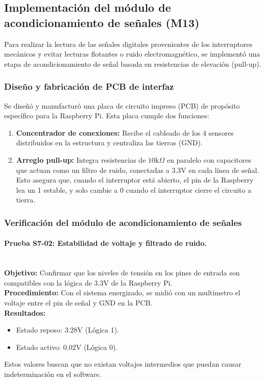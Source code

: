\subsection{Implementación del módulo de acondicionamiento de señales (M13)}

Para realizar la lectura de las señales digitales provenientes de los interruptores mecánicos y evitar lecturas flotantes o ruido electromagnético, se implementó una etapa de acondicionamiento de señal basada en resistencias de elevación (pull-up).

\subsubsection{Diseño y fabricación de PCB de interfaz}
Se diseñó y manufacturó una placa de circuito impreso (PCB) de propósito específico para la Raspberry Pi. Esta placa cumple dos funciones:
\begin{enumerate}
	\item \textbf{Concentrador de conexiones:} Recibe el cableado de los 4 sensores distribuidos en la estructura y centraliza las tierras (GND).
	\item \textbf{Arreglo pull-up:} Integra resistencias de $10\text{k}\Omega$ en paralelo con capacitores que actuan como un filtro de ruido, conectadas a 3.3V en cada línea de señal. Esto asegura que, cuando el interruptor está abierto, el pin de la Raspberry lea un 1 estable, y solo cambie a 0 cuando el interruptor cierre el circuito a tierra.
\end{enumerate}

\subsubsection{Verificación del módulo de acondicionamiento de señales}
\paragraph*{Prueba S7-02: Estabilidad de voltaje y filtrado de ruido.}\mbox{}\\
\textbf{Objetivo:} Confirmar que los niveles de tensión en los pines de entrada son compatibles con la lógica de 3.3V de la Raspberry Pi.
\\
\textbf{Procedimiento:} Con el sistema energizado, se midió con un multímetro el voltaje entre el pin de señal y GND en la PCB.
\\
\textbf{Resultados:}
\begin{itemize}
	\item Estado reposo: $3.28 \text{V}$ (Lógica 1).
	\item Estado activo: $0.02 \text{V}$ (Lógica 0).
\end{itemize}
Estos valores buscan que no existan voltajes intermedios que puedan causar indeterminación en el software. 

